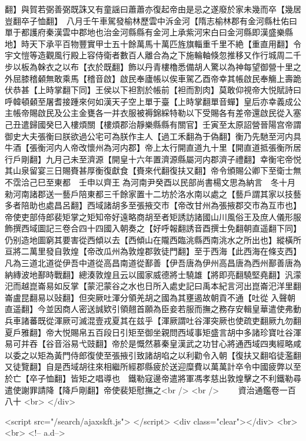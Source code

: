 翻】與賀若弼善弼既誅又有童謡曰蕭蕭亦復起帝由是忌之遂廢於家未幾而卒【幾居豈翻卒子恤翻】　八月壬午車駕發榆林歷雲中泝金河【隋志榆林郡有金河縣杜佑曰單于都護府秦漢雲中郡地也治金河縣縣有金河上承紫河宋白曰金河縣即漢盛樂縣地】時天下承平百物豐實甲士五十餘萬馬十萬匹旌旗輜重千里不絶【重直用翻】令宇文愷等造觀風行殿上容侍衛者數百人離合為之下施輪軸倏忽推移又作行城周二千步以板為榦衣之以布【衣於既翻】飾以丹青樓櫓悉備胡人驚以為神每望御營十里之外屈膝稽顙無敢乘馬【稽音啟】啟民奉廬帳以俟車駕乙酉帝幸其帳啟民奉觴上壽跪伏恭甚【上時掌翻下同】王侯以下袒割於帳前【袒而割肉】莫敢仰視帝大悦賦詩曰呼韓頓顙至屠耆接踵來何如漢天子空上單于臺【上時掌翻單音蟬】皇后亦幸義成公主帳帝賜啟民及公主金甕各一并衣服被褥錦綵特勒以下受賜各有差帝還啟民從入塞己丑遣歸國癸巳入樓煩關【樓煩郡治靜樂縣縣有關官】壬寅至太原詔營晉陽宫帝謂御史大夫張衡曰朕欲過公宅可為朕作主人【過工禾翻為于偽翻】衡乃先馳至河内具牛酒【張衡河内人帝改懷州為河内郡】帝上太行開直道九十里【開直道抵張衡所居行戶剛翻】九月己未至濟源【開皇十六年置濟源縣屬河内郡濟子禮翻】幸衡宅帝悦其山泉留宴三日賜賚甚厚衡復獻食【賚來代翻復扶又翻】帝令頒賜公卿下至衛士無不霑洽己巳至東都　壬申以齊王為河南尹癸酉以民部尚書楊文思為納言　冬十月勑河南諸郡送一藝戶陪東都三千餘家置十二坊於洛水南以處之【藝戶謂其家以技藝多者陪助也處昌呂翻】西域諸胡多至張掖交市【帝改甘州為張掖郡交市為互市也】帝使吏部侍郎裴矩掌之矩知帝好遠略商胡至者矩誘訪諸國山川風俗王及庶人儀形服飾撰西域圖記三卷合四十四國入朝奏之【好呼報翻誘音酉撰士免翻朝直遥翻下同】仍别造地圖窮其要害從西傾以去【西傾山在隴西臨洮縣西南洮水之所出也】縱橫所亘將二萬里發自敦煌【帝改瓜州為敦煌郡敦徒門翻】至于西海【此西海在條支西】凡為三道北道從伊吾中道從高昌南道從鄯善【伊吾唐為伊州高昌唐為西州鄯善唐為納縳波地鄯時戰翻】總湊敦煌且云以國家威德將士驍雄【將即亮翻驍堅堯翻】汎濛汜而越崑崙易如反掌【蒙汜蒙谷之水也日所入處史記曰禹本紀言河出崑崙汜洋里翻崙盧昆翻易以䜴翻】但突厥吐渾分領羌胡之國為其壅遏故朝貢不通【吐從入聲朝直遥翻】今並因商人密送誠欵引領翹首願為臣妾若服而撫之務存安輯皇華遣使弗動兵車諸蕃既從渾厥可滅混壹戎夏其在兹乎【渾厥謂吐谷渾突厥也使疏吏翻厥九勿翻夏戶雅翻】帝大悦賜帛五百段日引矩至御坐親問西域事矩盛言胡中多諸珍寶吐谷渾易可并吞【谷音浴易弋豉翻】帝於是慨然慕秦皇漢武之功甘心將通西域四夷經略咸以委之以矩為黃門侍郎復使至張掖引致諸胡啗之以利勸令入朝【復扶又翻啗徒濫翻又徒覽翻】自是西域胡往來相繼所經郡縣疲於送迎糜費以萬萬計卒令中國疲弊以至於亡【卒子恤翻】皆矩之唱導也　鐵勒寇邊帝遣將軍馮孝慈出敦煌擊之不利鐵勒尋遣使謝罪請降【降戶剛翻】帝使裴矩慰撫之<br />
<br />
　　資治通鑑卷一百八十  <br>
   </div> 

<script src="/search/ajaxskft.js"> </script>
 <div class="clear"></div>
<br>
<br>
 <!-- a.d-->

